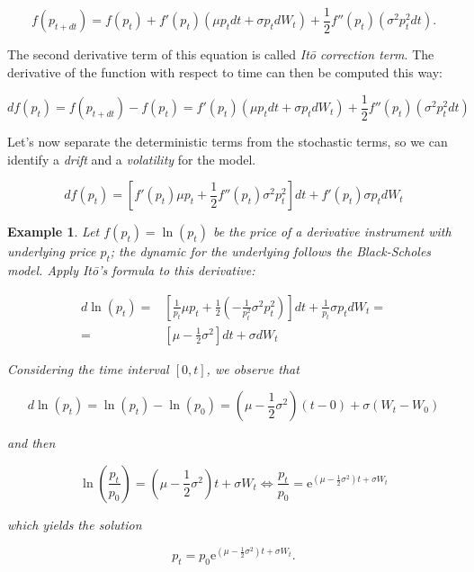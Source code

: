 \documentclass[oneside,titlepage,headinclude,12pt,a4paper,BCOR5mm,footinclude]{book}
\theoremstyle{defn}
\newtheorem{example}{Example}
\begin{document}
\[
  f(p_{t+dt}) = f(p_t) + f'(p_t)(\mu p_t dt + \sigma p_t dW_t) + 
  \frac{1}{2} f''(p_t)(\sigma^2 p_t^2 dt). 
\]

The second derivative term of this equation is called \textit{It\=o correction
term}.  The derivative  of  the function  with  respect to  time  can then  be
computed this way:

\[
  df(p_t) = f(p_{t+dt}) - f(p_t) = f'(p_t)(\mu p_t dt + \sigma p_t dW_t) + 
  \frac{1}{2} f''(p_t)(\sigma^2 p_t^2 dt)
\]

Let's now  separate the deterministic terms  from the stochastic terms,  so we
can identify a \textit{drift} and a \textit{volatility} for the model.

\[
  df(p_t) = \left[ f'(p_t)\mu p_t + \frac{1}{2}f''(p_t)\sigma^2 p_t^2\right]dt
    + f'(p_t)\sigma p_t dW_t
\]

\begin{example}
  Let  $f(p_t) =  \ln(p_t)$  be  the price  of  a  derivative instrument  with
  underlying  price  $p_t$;  the  dynamic   for  the  underlying  follows  the
  Black-Scholes model. Apply It\=o's formula to this derivative:

  \begin{align*}
    d\ln(p_t) = & \left[ \frac{1}{p_t} \mu p_t + \frac{1}{2}\left( 
      -\frac{1}{p_t^2}\sigma^2 p_t^2\right)\right]dt +
      \frac{1}{p_t}\sigma p_t dW_t = \\
      = & \left[\mu - \frac{1}{2} \sigma^2 \right]dt + \sigma dW_t
  \end{align*}

  Considering the time interval $[0,t]$, we observe that
  
  \[
    d\ln(p_t) = \ln(p_t) - \ln(p_0) = \left( \mu - \frac{1}{2}\sigma^2 \right)
      (t-0) + \sigma (W_t - W_0)
  \]
  
  and then
  
  \[
    \ln\left(\frac{p_t}{p_0}\right) = \left(\mu -\frac{1}{2}\sigma^2\right)t + \sigma W_t
    \iff
    \frac{p_t}{p_0} = \mathrm{e}^{\left(\mu - \frac{1}{2}\sigma^2\right)t + \sigma W_t}
  \]
  
  which yields the solution
  
  \[
    p_t = p_0 \mathrm{e}^{\left(\mu - \frac{1}{2}\sigma^2\right)t + \sigma W_t}.
  \]
\end{example}
\end{document}
